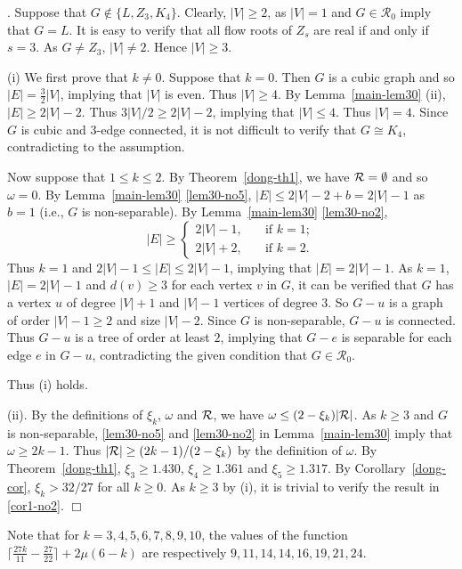 \documentclass[11pt]{article}
\newcommand{\proof}
{{\noindent {\em Proof}.\quad}\setcounter{countclaim}{0}
\setcounter{countcase}{0}}
\newcommand{\proofend}{{\hfill$\Box$}}
\newcounter{countclaim}
\newcounter{countcase}
\def \setr{{\cal R}}
\def \setgr {\mathscr{R}}
\newcommand \nroot[1] 
{{\lceil \frac{27 #1}{11} -\frac{27}{22}\rceil+2\mu(6-#1)}}
\begin{document}
\proof  
Suppose  that  $G\not \in \{L, Z_3,K_4\}$.
Clearly, $|V|\ge 2$, as $|V|=1$ and $G\in \setgr_0$ 
imply that $G=L$. 
It is easy to verify that all flow roots of 
$Z_s$ are real if and only if $s=3$.
As $G\ne Z_3$,  $|V|\ne 2$.
Hence $|V|\ge 3$.


(i)  
We first prove that $k\ne 0$.
Suppose that $k=0$.
Then $G$ is a cubic graph and so
$|E|=\frac 32 |V|$, implying that $|V|$ is even. 
Thus $|V|\ge 4$. 
By Lemma~\ref{main-lem30} (ii),
$|E|\ge 2|V|-2$. 
Thus $3|V|/2\ge 2|V|-2$, implying that $|V|\le 4$.
Thus  $|V|=4$. 
Since $G$ is cubic and $3$-edge connected,  
it is not difficult to verify that $G\cong K_4$, 
contradicting to the assumption. 

 
Now suppose that  $1\le k\le 2$. 
By Theorem~\ref{dong-th1},
we have $\setr=\emptyset$ 
and so $\omega=0$. 
By Lemma~\ref{main-lem30} \ref{lem30-no5}, 
$|E|\le 2|V|-2+b=2|V|-1$ as $b=1$ (i.e., $G$ is non-separable).
By Lemma~\ref{main-lem30} \ref{lem30-no2},  
$$
|E|\ge 
\left \{ 
\begin{array}{ll}
2|V|-1, \quad &\mbox{if }k=1; \\
2|V|+2, &\mbox{if }k=2.
\end{array}
\right.
$$ 
Thus $k=1$ and 
$2|V|-1\le |E|\le 2|V|-1$,
implying that $|E|=2|V|-1$.
As $k=1$, $|E|=2|V|-1$ and 
$d(v)\ge 3$ for each vertex $v$ in $G$, 
it can be verified that 
$G$ has a vertex $u$ of degree $|V|+1$ 
and $|V|-1$ vertices of degree $3$.
So $G-u$ is a graph of order $|V|-1\ge 2$ and size $|V|-2$.
Since $G$ is non-separable, $G-u$ is connected.
Thus $G-u$ is a tree of order at least $2$, 
implying that $G-e$ is separable for each edge 
$e$ in $G-u$, contradicting the given condition
that $G\in \setgr_0$. 

Thus (i) holds.

(ii). By the definitions of $\xi_k$, $\omega$ and $\setr$, we have $\omega\le (2-\xi_k)|\setr|$.
As $k\ge 3$ and $G$ is non-separable, 
\ref{lem30-no5} and \ref{lem30-no2} in Lemma~\ref{main-lem30}
imply that $\omega\ge 2k-1$.
Thus  $|\setr| \ge (2k-1)/(2-\xi_k)$ 
by the definition of $\omega$.
By Theorem~\ref{dong-th1},
 $\xi_3\ge 1.430$, $\xi_4\ge 1.361$ and 
$\xi_5\ge 1.317$.
By Corollary~\ref{dong-cor}, $\xi_k> 32/27$ for all $k\ge 0$.
As $k\ge 3$ by (i), 
it is trivial to verify the result in \ref{cor1-no2}.
\proofend



Note that for $k=3,4,5,6,7,8,9,10$, 
the values of the function $\nroot{k}$ are 
respectively $9, 11,14,14, 16, 19, 21, 24$.
\end{document}
